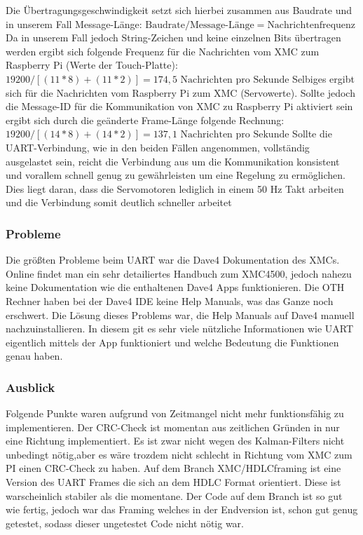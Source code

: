 \documentclass[12pt,a4paper,bibliography=totoc,listof=totoc]{scrartcl}
\begin{document}
Die Übertragungsgeschwindigkeit setzt sich hierbei zusammen aus Baudrate und in unserem Fall Message-Länge:\newline
$\text{Baudrate}/ \text{Message-Länge} = \text {Nachrichtenfrequenz} $\newline
Da in unserem Fall jedoch String-Zeichen und keine einzelnen Bits übertragen werden ergibt sich folgende Frequenz für 
die Nachrichten vom XMC zum Raspberry Pi (Werte der Touch-Platte):\newline
$ 19200/[(11*8)+(11*2)]= 174,5 \text { Nachrichten pro Sekunde}$\newline
Selbiges ergibt sich für die Nachrichten vom Raspberry Pi zum XMC (Servowerte). Sollte jedoch die Message-ID für die Kommunikation 
von XMC zu Raspberry Pi aktiviert sein ergibt sich durch die geänderte Frame-Länge folgende Rechnung:\newline
$19200 /[(14*8)+(14*2)]=137,1\text { Nachrichten pro Sekunde}$ \newline
Sollte die UART-Verbindung, wie in den beiden Fällen angenommen, vollständig ausgelastet sein, reicht die Verbindung aus um die 
Kommunikation konsistent und vorallem schnell genug zu gewährleisten um eine Regelung zu ermöglichen. Dies liegt daran, dass die 
Servomotoren lediglich in einem 50 Hz Takt arbeiten und die Verbindung somit deutlich schneller arbeitet


\subsubsection{Probleme}
Die größten Probleme beim UART war die Dave4 Dokumentation des XMCs. Online findet man ein sehr detailiertes Handbuch zum 
XMC4500, jedoch nahezu keine Dokumentation wie die enthaltenen Dave4 Apps funktionieren. Die OTH Rechner haben bei der Dave4 IDE keine 
Help Manuals, was das Ganze noch erschwert. Die Lösung dieses Problems war, die Help Manuals auf Dave4 manuell 
nachzuinstallieren. In diesem git es sehr viele nützliche Informationen wie UART eigentlich mittels der App funktioniert und welche Bedeutung die Funktionen genau haben.

\subsubsection{Ausblick}
Folgende Punkte waren aufgrund von Zeitmangel nicht mehr funktionsfähig zu implementieren.
Der CRC-Check ist momentan aus zeitlichen Gründen in nur eine Richtung implementiert. Es ist zwar nicht wegen des Kalman-Filters nicht unbedingt nötig,aber
 es wäre trozdem nicht schlecht in Richtung vom XMC zum PI einen CRC-Check zu haben. 
Auf dem Branch XMC/HDLCframing ist eine Version des UART Frames die sich an dem HDLC Format orientiert. Diese 
ist warscheinlich stabiler als die momentane. Der Code auf dem Branch ist so gut wie fertig, jedoch war das Framing welches 
in der Endversion ist, schon gut genug getestet, sodass dieser ungetestet Code nicht nötig war.
\end{document}
